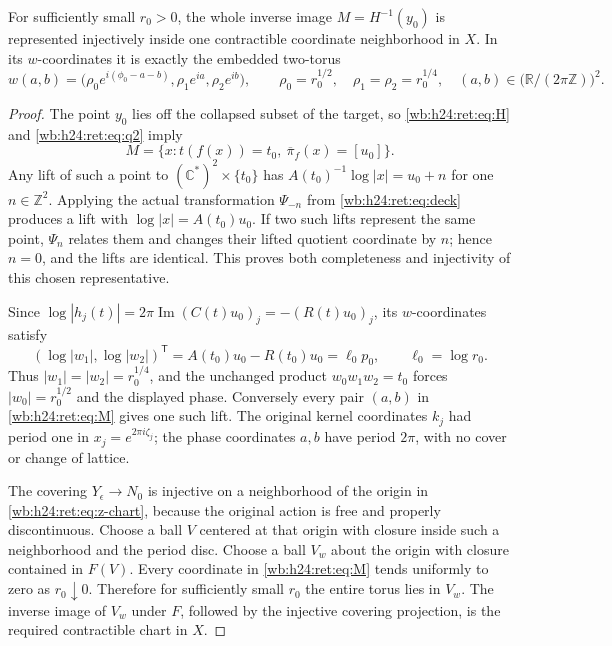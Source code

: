 \begin{lemma}\label{wb:h24:ret:chart-lemma}
For sufficiently small \(r_0>0\), the whole inverse image
\(M=H^{-1}(y_0)\) is represented injectively inside one contractible
coordinate neighborhood in \(X\).  In its \(w\)-coordinates it is
exactly the embedded two-torus
\begin{equation}
 w(a,b)=
 \bigl(\rho_0e^{i(\phi_0-a-b)},\rho_1e^{ia},\rho_2e^{ib}\bigr),
 \qquad
 \rho_0=r_0^{1/2},\quad \rho_1=\rho_2=r_0^{1/4},
 \quad (a,b)\in\bigl(\mathbb R/(2\pi\mathbb Z)\bigr)^2.
 \label{wb:h24:ret:eq:M}
\end{equation}
\end{lemma}
\begin{proof}
The point \(y_0\) lies off the collapsed subset of the target, so
\eqref{wb:h24:ret:eq:H} and \eqref{wb:h24:ret:eq:q2} imply
\[
 M=\{x:t(f(x))=t_0,\ \overline\pi_f(x)=[u_0]\}.
\]
Any lift of such a point to \((\mathbb C^*)^2\times\{t_0\}\) has
\(A(t_0)^{-1}\log|x|=u_0+n\) for one \(n\in\mathbb Z^2\).
Applying the actual transformation \(\Psi_{-n}\) from
\eqref{wb:h24:ret:eq:deck} produces a lift with
\(\log|x|=A(t_0)u_0\).  If two such lifts represent the same point,
\(\Psi_n\) relates them and changes their lifted quotient coordinate
by \(n\); hence \(n=0\), and the lifts are identical.  This proves
both completeness and injectivity of this chosen representative.

Since
\(\log|h_j(t)|=2\pi\operatorname{Im}(C(t)u_0)_j
=-(R(t)u_0)_j\), its \(w\)-coordinates satisfy
\[
 (\log|w_1|,\log|w_2|)^{\mathsf T}
 =A(t_0)u_0-R(t_0)u_0=\ell_0p_0,
 \qquad \ell_0=\log r_0.
\]
Thus \(|w_1|=|w_2|=r_0^{1/4}\), and the unchanged product
\(w_0w_1w_2=t_0\) forces \(|w_0|=r_0^{1/2}\) and the displayed
phase.  Conversely every pair \((a,b)\) in \eqref{wb:h24:ret:eq:M} gives one
such lift.  The original kernel coordinates \(k_j\) had period one
in \(x_j=e^{2\pi i\zeta_j}\); the phase coordinates \(a,b\) have
period \(2\pi\), with no cover or change of lattice.

The covering \(Y_\epsilon\to N_0\) is injective on a neighborhood of
the origin in \eqref{wb:h24:ret:eq:z-chart}, because the original action is free
and properly discontinuous.  Choose a ball \(V\) centered at that
origin with closure inside such a neighborhood and the period disc.
Choose a ball \(V_w\) about the origin with closure contained in
\(F(V)\).  Every coordinate in \eqref{wb:h24:ret:eq:M} tends uniformly to zero
as \(r_0\downarrow0\).  Therefore for sufficiently small \(r_0\)
the entire torus lies in \(V_w\).  The inverse image of \(V_w\)
under \(F\), followed by the injective covering projection, is the
required contractible chart in \(X\).
\end{proof}

